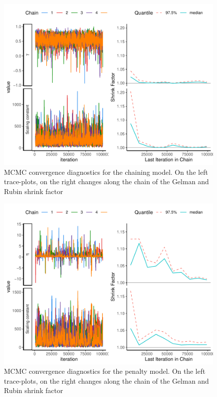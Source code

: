 \documentclass[
  12pt,
]{article}
\begin{document}
\begin{figure}
\includegraphics[width=1\linewidth]{manuscript_BE_files/figure-latex/diaggamFAA-1} \caption{MCMC convergence diagnostics for the chaining model. On the left trace-plots, on the right changes along the chain of the Gelman and Rubin shrink factor }\label{fig:diaggamFAA}
\end{figure}

\begin{figure}
\includegraphics[width=1\linewidth]{manuscript_BE_files/figure-latex/diagNegFAA-1} \caption{MCMC convergence diagnostics for the penalty model. On the left trace-plots, on the right changes along the chain of the Gelman and Rubin shrink factor}\label{fig:diagNegFAA}
\end{figure}
\end{document}
